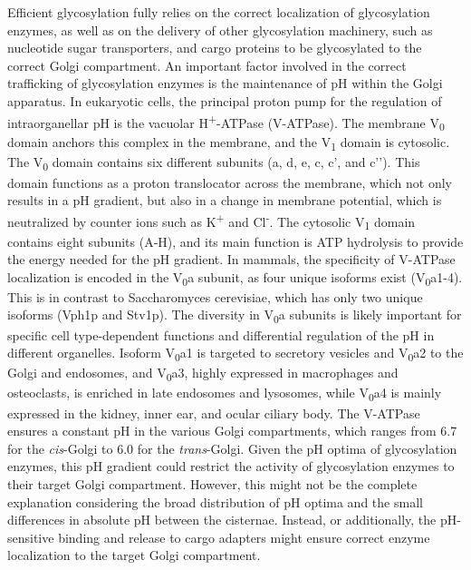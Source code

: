 Efficient glycosylation fully relies on the correct localization of glycosylation enzymes, as well as on the delivery of other glycosylation machinery, such as nucleotide sugar transporters, and cargo proteins to be glycosylated to the correct Golgi compartment. An important factor involved in the correct trafficking of glycosylation enzymes is the maintenance of pH within the Golgi apparatus. In eukaryotic cells, the principal proton pump for the regulation of intraorganellar pH is the vacuolar H\textsuperscript{+}-ATPase (V-ATPase). The membrane V\textsubscript{0} domain anchors this complex in the membrane, and the V\textsubscript{1} domain is cytosolic\cite{forgac_vacuolar_2007}. The V\textsubscript{0} domain contains six different subunits (a, d, e, c, c’, and c’’). This domain functions as a proton translocator across the membrane, which not only results in a pH gradient, but also in a change in membrane potential, which is neutralized by counter ions such as K\textsuperscript{+} and Cl\textsuperscript{-}. The cytosolic V\textsubscript{1} domain contains eight subunits (A-H), and its main function is ATP hydrolysis\cite{forgac_vacuolar_2007} to provide the energy needed for the pH gradient. In mammals, the specificity of V-ATPase localization is encoded in the V\textsubscript{0}a subunit, as four unique isoforms exist (V\textsubscript{0}a1-4). This is in contrast to Saccharomyces cerevisiae, which has only two unique isoforms (Vph1p and Stv1p)\cite{forgac_vacuolar_2007,nishi_vacuolar_2002,kawasaki-nishi_amino-terminal_2001,kawasaki-nishi_yeast_2001,manolson_stv1_1994}. The diversity in V\textsubscript{0}a subunits is likely important for specific cell type-dependent functions and differential regulation of the pH in different organelles. Isoform V\textsubscript{0}a1 is targeted to secretory vesicles and V\textsubscript{0}a2 to the Golgi and endosomes, and V\textsubscript{0}a3, highly expressed in macrophages and osteoclasts\cite{sun-wada_direct_2009,toyomura_lysosomes_2003}, is enriched in late endosomes and lysosomes, while V\textsubscript{0}a4 is mainly expressed in the kidney, inner ear, and ocular ciliary body\cite{saw_vacuolar_2011,kornak_impaired_2008,pietrement_distinct_2006,hurtado-lorenzo_v-atpase_2006}. The V-ATPase ensures a constant pH in the various Golgi compartments, which ranges from 6.7 for the \emph{cis}-Golgi to 6.0 for the \emph{trans}-Golgi\cite{casey_sensors_2010}. Given the pH optima of glycosylation enzymes, this pH gradient could restrict the activity of glycosylation enzymes to their target Golgi compartment\cite{gawlitzek_ammonium_2000}. However, this might not be the complete explanation considering the broad distribution of pH optima and the small differences in absolute pH between the cisternae. Instead, or additionally, the pH-sensitive binding and release to cargo adapters might ensure correct enzyme localization to the target Golgi compartment\cite{fisher_bridging_2016,rivinoja_elevated_2009,maeda_chapter_2010}.

